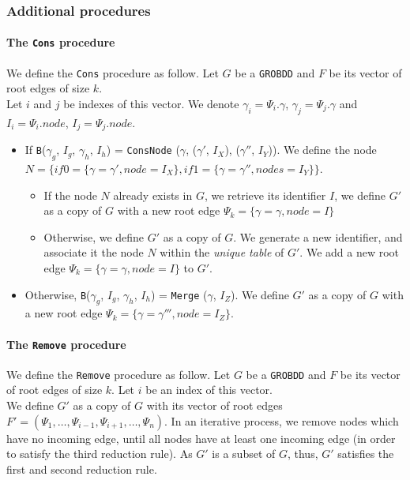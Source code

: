 \documentclass[a4paper,10pt]{article}
\newcommand{\GroBdd}{\texttt{GROBDD}}
\begin{document}
\subsubsection{Additional procedures}

\paragraph{The \texttt{Cons} procedure\\}
We define the \texttt{Cons} procedure as follow.
Let $G$ be a \GroBdd{} and $F$ be its vector of root edges of size $k$.\\
Let $i$ and $j$ be indexes of this vector.
We denote $\gamma_i = \Psi_i.\gamma$, $\gamma_j = \Psi_j.\gamma$ and $I_i = \Psi_i.node$, $I_j = \Psi_j.node$.
\begin{itemize}
\item If \texttt{B}($\gamma_g$, $I_g$, $\gamma_h$, $I_h$) = \texttt{ConsNode} ($\gamma$, ($\gamma'$, $I_X$), ($\gamma''$, $I_Y$)). We define the node $N = \{if0 = \{\gamma = \gamma', node = I_X\}, if1 = \{\gamma = \gamma'', nodes = I_Y\}\}$.\begin{itemize}
\item If the node $N$ already exists in $G$, we retrieve its identifier $I$, we define $G'$ as a copy of $G$ with a new root edge $\Psi_k = \{\gamma = \gamma, node = I\}$
\item Otherwise, we define $G'$ as a copy of $G$.
We generate a new identifier, and associate it the node $N$ within the \textit{unique table} of $G'$.
We add a new root edge $\Psi_k = \{\gamma = \gamma, node = I\}$ to $G'$.
\end{itemize}
\item Otherwise, \texttt{B}($\gamma_g$, $I_g$, $\gamma_h$, $I_h$) = \texttt{Merge} ($\gamma$, $I_Z$). We define $G'$ as a copy of $G$ with a new root edge $\Psi_k = \{\gamma = \gamma''', node = I_Z\}$.
\end{itemize}

\paragraph{The \texttt{Remove} procedure\\}
We define the \texttt{Remove} procedure as follow.
Let $G$ be a \GroBdd{} and $F$ be its vector of root edges of size $k$.
Let $i$ be an index of this vector.\\
We define $G'$ as a copy of $G$ with its vector of root edges $F' = (\Psi_1, \dots, \Psi_{i-1}, \Psi_{i+1}, \dots, \Psi_n)$.
In an iterative process, we remove nodes which have no incoming edge, until all nodes have at least one incoming edge (in order to satisfy the third reduction rule).
As $G'$ is a subset of $G$, thus, $G'$ satisfies the first and second reduction rule.
\end{document}
